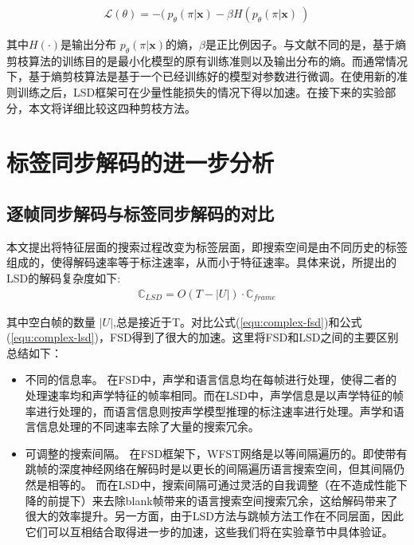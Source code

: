 \begin{equation}
\label{equ:ent-pen-model}
\begin{split}
\mathcal{L}(\theta)= - (\ p_\theta (\pi|\mathbf{x}) - \beta H(p_\theta (\pi|\mathbf{x})\ )
\end{split}
\end{equation}

其中$H(\cdot)$是输出分布 $p_\theta (\pi|\mathbf{x})$的熵，$\beta$是正比例因子。与文献\cite{pereyra2017regularizing}不同的是，基于熵剪枝算法的训练目的是最小化模型的原有训练准则以及输出分布的熵。而通常情况下，基于熵剪枝算法是基于一个已经训练好的模型对参数进行微调。在使用新的准则训练之后，LSD框架可在少量性能损失的情况下得以加速。在接下来的实验部分，本文将详细比较这四种剪枝方法。


\section{标签同步解码的进一步分析}
\label{chap:lsd-lsd-more}

\subsection{逐帧同步解码与标签同步解码的对比}
\label{chap:lsd-lsd-cmp}

本文提出将特征层面的搜索过程改变为标签层面，即搜索空间是由不同历史的标签组成的，使得解码速率等于标注速率，从而小于特征速率。具体来说，所提出的LSD的解码复杂度如下:
  \begin{equation}
\label{equ:complex-lsd}
\begin{split}
\mathbb{C}_{LSD} = O (T-|U|) \cdot \mathbb{C}_{frame}
\end{split}
\end{equation}


其中空白帧的数量 $|U|$,总是接近于T。对比公式(\ref{equ:complex-fsd})和公式(\ref{equ:complex-lsd})，FSD得到了很大的加速。这里将FSD和LSD之间的主要区别总结如下：
\begin{itemize}
\item 不同的信息率。 在FSD中，声学和语言信息均在每帧进行处理，使得二者的处理速率均和声学特征的帧率相同。而在LSD中，声学信息是以声学特征的帧率进行处理的，而语言信息则按声学模型推理的标注速率进行处理。声学和语言信息处理的不同速率去除了大量的搜索冗余。
\item 可调整的搜索间隔。 在FSD框架下，WFST网络是以等间隔遍历的。即使带有跳帧的深度神经网络在解码\cite{vanhoucke2013multiframe}时是以更长的间隔遍历语言搜索空间，但其间隔仍然是相等的。 而在LSD中，搜索间隔可通过灵活的自我调整（在不造成性能下降的前提下）来去除blank帧带来的语言搜索空间搜索冗余，这给解码带来了很大的效率提升。另一方面，由于LSD方法与跳帧方法工作在不同层面，因此它们可以互相结合取得进一步的加速，这些我们将在实验章节中具体验证。
\end{itemize}

